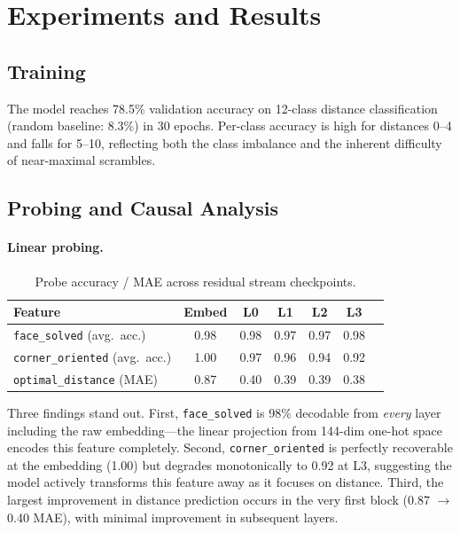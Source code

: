 \documentclass[12pt]{article}
\begin{document}
\section{Experiments and Results}

\subsection{Training}

The model reaches 78.5\% validation accuracy on 12-class distance classification
(random baseline: 8.3\%) in 30 epochs.  Per-class accuracy is high for distances
0--4 and falls for 5--10, reflecting both the class imbalance and the inherent
difficulty of near-maximal scrambles.

\subsection{Probing and Causal Analysis}

\paragraph{Linear probing.}
\begin{table}[h]
\centering
\small
\begin{tabular}{lcccccc}
\toprule
Feature & Embed & L0 & L1 & L2 & L3 \\
\midrule
\texttt{face\_solved} (avg.\ acc.) & 0.98 & 0.98 & 0.97 & 0.97 & 0.98 \\
\texttt{corner\_oriented} (avg.\ acc.) & 1.00 & 0.97 & 0.96 & 0.94 & 0.92 \\
\texttt{optimal\_distance} (MAE) & 0.87 & 0.40 & 0.39 & 0.39 & 0.38 \\
\bottomrule
\end{tabular}
\caption{Probe accuracy / MAE across residual stream checkpoints.}
\label{tab:probing}
\end{table}

Three findings stand out.  First, \texttt{face\_solved} is 98\% decodable from
\emph{every} layer including the raw embedding---the linear projection from
144-dim one-hot space encodes this feature completely.  Second,
\texttt{corner\_oriented} is perfectly recoverable at the embedding (1.00) but
degrades monotonically to 0.92 at L3, suggesting the model actively transforms
this feature away as it focuses on distance.  Third, the largest improvement in
distance prediction occurs in the very first block (0.87 $\to$ 0.40 MAE), with
minimal improvement in subsequent layers.
\end{document}
